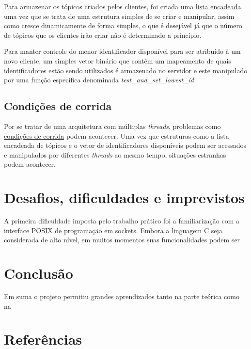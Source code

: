 \documentclass{article}
\begin{document}
Para armazenar os tópicos criados pelos clientes, foi criada uma \href{https://en.wikipedia.org/wiki/Linked_list}{lista encadeada}, uma vez que se trata de uma estrutura simples
de se criar e manipular, assim como cresce dinamicamente de forma simples, o que é desejável já que o número de tópicos que os clientes irão criar não é determinado a princípio.

Para manter controle do menor identificador disponível para ser atribuído à um novo cliente, um simples vetor binário que contêm um mapeamento de quais identificadores estão sendo utilizados
 é armazenado no servidor e este manipulado por uma função específica denominada \textit{test_and_set_lowest_id.}

 \subsection{Condições de corrida}

 Por se tratar de uma arquitetura com múltiplas \textit{threads}, problemas como \href{https://learn.microsoft.com/en-us/troubleshoot/developer/visualstudio/visual-basic/language-compilers/race-conditions-deadlocks}{condições de corrida}
  podem acontecer. Uma vez que estruturas como a lista encadeada de tópicos e o vetor de identificadores disponíveis
 podem ser acessados e manipulados por diferentes \textit{threads} ao mesmo tempo, situações estranhas podem acontecer.

\section{Desafios, dificuldades e imprevistos}

A primeira dificuldade imposta pelo trabalho prático foi a familiarização com a
interface POSIX de programação em sockets. Embora a linguagem C seja
considerada de alto nível, em muitos momentos suas funcionalidades podem ser

\section{Conclusão}

Em suma o projeto permitiu grandes aprendizados tanto na parte teórica como na

\section{Referências}
\end{document}
